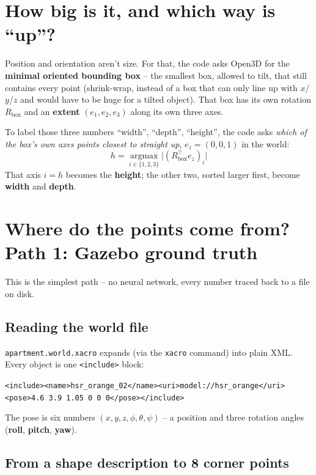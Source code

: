 \documentclass[11pt]{article}
\begin{document}
\section{How big is it, and which way is ``up''?}

Position and orientation aren't size. For that, the code asks Open3D for
the \textbf{minimal oriented bounding box} -- the smallest box, allowed to
tilt, that still contains every point (shrink-wrap, instead of a box that
can only line up with $x$/$y$/$z$ and would have to be huge for a tilted
object). That box has its own rotation $R_{\text{box}}$ and an
\textbf{extent} $(e_1, e_2, e_3)$ along its own three axes.

To label those three numbers ``width'', ``depth'', ``height'', the code asks
\emph{which of the box's own axes points closest to straight up}, $e_z =
(0,0,1)$ in the world:
\[
h = \operatorname*{argmax}_{i \in \{1,2,3\}} \big| (R_{\text{box}}^{\top} e_z)_i \big|
\]
That axis $i=h$ becomes the \textbf{height}; the other two, sorted larger
first, become \textbf{width} and \textbf{depth}.

\section{Where do the points come from? Path 1: Gazebo ground truth}

This is the simplest path -- no neural network, every number traced back to
a file on disk.

\subsection{Reading the world file}

\texttt{apartment.world.xacro} expands (via the \texttt{xacro} command) into
plain XML. Every object is one \texttt{<include>} block:
\begin{center}
\texttt{<include><name>hsr\_orange\_02</name><uri>model://hsr\_orange</uri>}\\
\texttt{<pose>4.6 3.9 1.05 0 0 0</pose></include>}
\end{center}
The pose is six numbers $(x, y, z, \phi, \theta, \psi)$ -- a position and
three rotation angles (\textbf{roll}, \textbf{pitch}, \textbf{yaw}).

\subsection{From a shape description to 8 corner points}
\end{document}
